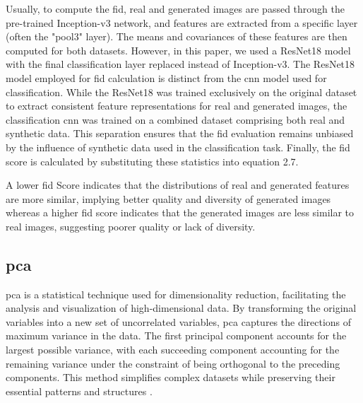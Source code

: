 Usually, to compute the \gls{fid}, real and generated images are passed through the pre-trained Inception-v3 network, and features are extracted from a specific layer (often the "pool3" layer). The means and covariances of these features are then computed for both datasets. However, in this paper, we used a ResNet18 model with the final classification layer replaced instead of Inception-v3.  The ResNet18 model employed for \gls{fid} calculation is distinct from the \gls{cnn} model used for classification. While the ResNet18 was trained exclusively on the original dataset to extract consistent feature representations for real and generated images, the classification \gls{cnn} was trained on a combined dataset comprising both real and synthetic data. This separation ensures that the \gls{fid} evaluation remains unbiased by the influence of synthetic data used in the classification task. Finally, the \gls{fid} score is calculated by substituting these statistics into equation 2.7. 

A lower \gls{fid} Score indicates that the distributions of real and generated features are more similar, implying better quality and diversity of generated images whereas a higher \gls{fid} score indicates that the generated images are less similar to real images, suggesting poorer quality or lack of diversity.

\subsection{\gls{pca}}
\gls{pca} is a statistical technique used for dimensionality reduction, facilitating the analysis and visualization of high-dimensional data. By transforming the original variables into a new set of uncorrelated variables, \gls{pca} captures the directions of maximum variance in the data. The first principal component accounts for the largest possible variance, with each succeeding component accounting for the remaining variance under the constraint of being orthogonal to the preceding components. This method simplifies complex datasets while preserving their essential patterns and structures \cite{12}.


